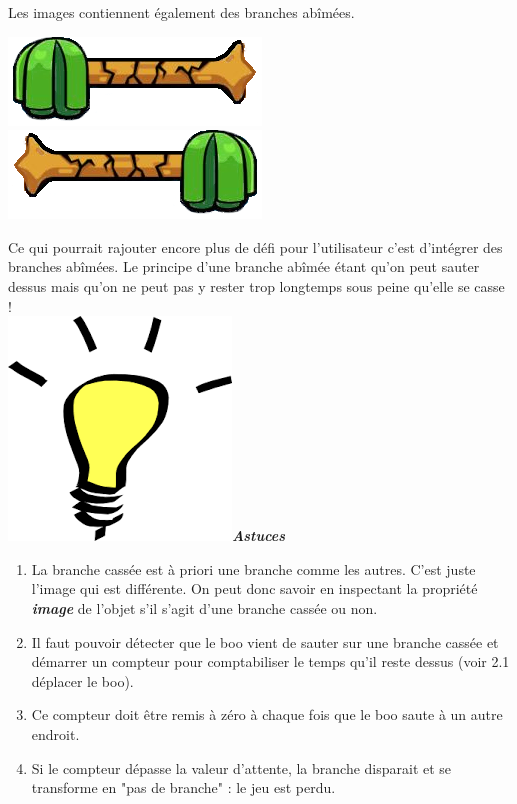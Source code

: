 \documentclass[french]{article}
\newcommand{\tips}{\includegraphics[scale=0.08]{tips}\textbf{\textit{Astuces\\}}}
\begin{document}
Les images contiennent également des branches abîmées.

\begin{center}
	\includegraphics[scale=0.5]{bad_branch_left}
	\includegraphics[scale=0.5]{bad_branch_right}
\end{center}	

Ce qui pourrait rajouter encore plus de défi pour l'utilisateur c'est d'intégrer des branches abîmées. Le principe d'une branche abîmée étant qu'on peut sauter dessus mais qu'on ne peut pas y rester trop longtemps sous peine qu'elle se casse !\\

\tips

\begin{enumerate}
	
	\item La branche cassée est à priori une branche comme les autres. C'est juste l'image qui est différente. On peut donc savoir en inspectant la propriété \textbf{\textit{image}} de l'objet s'il s'agit d'une branche cassée ou non.\\
	
	\item Il faut pouvoir détecter que le boo vient de sauter sur une branche cassée et démarrer un compteur pour comptabiliser le temps qu'il reste dessus (voir 2.1 déplacer le boo).\\
	
	\item Ce compteur doit être remis à zéro à chaque fois que le boo saute à un autre endroit.\\
	
	\item Si le compteur dépasse la valeur d'attente, la branche disparait et se transforme en "pas de branche" : le jeu est perdu.\\

\end{enumerate}
\end{document}
